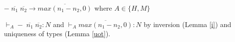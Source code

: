 \begin{case}
$-\;\overline{n_{1}}\;\overline{n_{2}}\rightarrow\overline{max(n_{1}-n_{2},0)}$ where $A\in\lbrace H,M\rbrace$

$\vdash_{A}-\;\overline{n_{1}}\;\overline{n_{2}}:N$ and $\vdash_{A}\overline{max(n_{1}-n_{2},0)}:N$ by inversion (Lemma \ref{i}) and uniqueness of types (Lemma \ref{uot}).
\end{case}